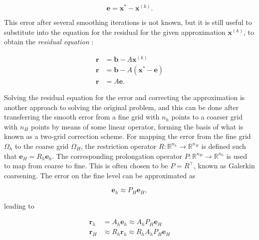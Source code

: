 \begin{equation}
	\mathbf{e} = \mathbf{x}^* - \mathbf{x}^{(k)}.
\end{equation}

This error after several smoothing iterations is not known, but it is still useful to substitute into the equation for the residual for the given approximation $\mathbf{x}^{(k)}$, to obtain the \emph{residual equation} \cite{Briggs2000}:

\begin{equation}
	\begin{aligned}
	\mathbf{r} &= \mathbf{b} - A\mathbf{x}^{(k)} \\
	\mathbf{r} &= \mathbf{b} - A\left( \mathbf{x}^* - \mathbf{e} \right) \\
	\mathbf{r} &= A\mathbf{e}.
	\end{aligned}
\end{equation}


Solving the residual equation for the error and correcting the approximation is another approach to solving the original problem, and this can be done after transferring the smooth error from a fine grid with $n_h$ points to a coarser grid with $n_H$ points by means of some linear operator, forming the basis of what is known as a two-grid correction scheme. For mapping the error from the fine grid $\Omega_h$ to the coarse grid $\Omega_H$, the restriction operator $R : \mathbb{R}^{n_h} \rightarrow \mathbb{R}^{n_H}$ is defined such that $\mathbf{e}_H = R_h \mathbf{e}_h$. The corresponding prolongation operator $P : \mathbb{R}^{n_H} \rightarrow \mathbb{R}^{n_h}$ is used to map from coarse to fine. This is often chosen to be $P = R^\top$, known as Galerkin coarsening. The error on the fine level can be approximated as

\begin{equation}
	\mathbf{e}_h \approx P_H \mathbf{e}_H,
\end{equation}

leading to

\begin{equation}
	\begin{aligned}
	\mathbf{r}_h & = A_h \mathbf{e}_h \approx A_h P_H \mathbf{e}_H \\
	\mathbf{r}_H & \approx R_h \mathbf{r}_h \approx R_h A_h P_H \mathbf{e}_H
	\end{aligned}
\end{equation}

